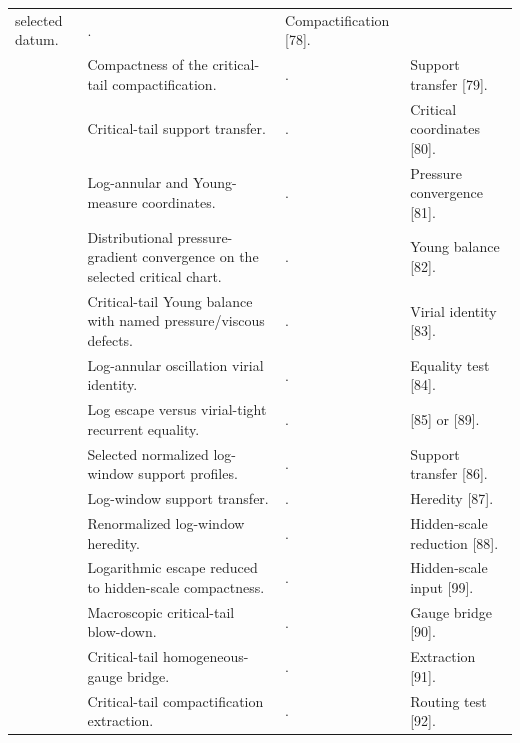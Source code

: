 \documentclass[11pt]{amsart}
\numberwithin{equation}{section}
\theoremstyle{plain}
\theoremstyle{definition}
\theoremstyle{remark}
\begin{document}
\begin{longtable}{@{}L{0.06\textwidth}L{0.25\textwidth}L{0.40\textwidth}L{0.21\textwidth}@{}}
selected datum. &
. & Compactification [78].\\
\relax
[78] & Compactness of the critical-tail compactification. &
. & Support transfer [79].\\
\relax
[79] & Critical-tail support transfer. &
. & Critical coordinates [80].\\
\relax
[80] & Log-annular and Young-measure coordinates. &
. & Pressure convergence [81].\\
\relax
[81] & Distributional pressure-gradient convergence on the selected critical chart. &
. & Young balance [82].\\
\relax
[82] & Critical-tail Young balance with named pressure/viscous defects. &
. & Virial identity [83].\\
\relax
[83] & Log-annular oscillation virial identity. &
. & Equality test [84].\\
\relax
[84] & Log escape versus virial-tight recurrent equality. &
. & [85] or [89].\\
\relax
[85] & Selected normalized log-window support profiles. &
. & Support transfer [86].\\
\relax
[86] & Log-window support transfer. &
. & Heredity [87].\\
\relax
[87] & Renormalized log-window heredity. &
. & Hidden-scale reduction [88].\\
\relax
[88] & Logarithmic escape reduced to hidden-scale compactness. &
. & Hidden-scale input [99].\\
\relax
[89] & Macroscopic critical-tail blow-down. &
. & Gauge bridge [90].\\
\relax
[90] & Critical-tail homogeneous-gauge bridge. &
. & Extraction [91].\\
\relax
[91] & Critical-tail compactification extraction. &
. & Routing test [92].\\

\end{longtable}
\end{document}
